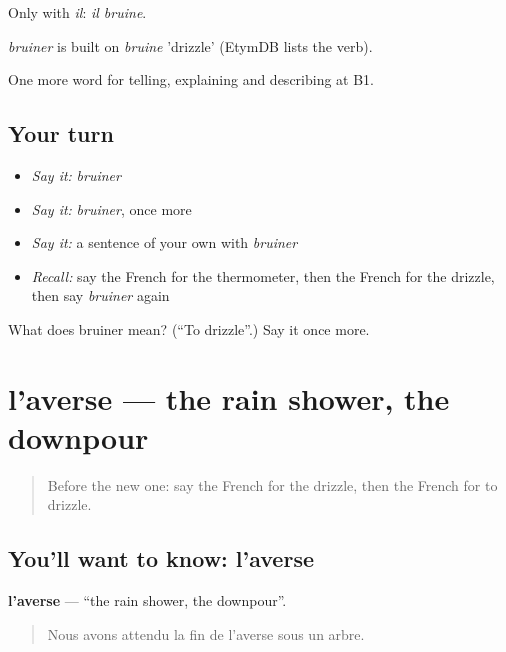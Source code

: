 Only with \emph{il}: \emph{il bruine}.

\begin{cousinweb}
\emph{bruiner} is built on \emph{bruine} 'drizzle' (EtymDB lists the verb).
\end{cousinweb}

\begin{grammarlens}[title={What you've built}]
One more word for telling, explaining and describing at B1.
\end{grammarlens}

\subsection*{Your turn}
\begin{itemize}
\raggedright
  \item \emph{Say it:} \emph{bruiner}
  \item \emph{Say it:} \emph{bruiner}, once more
  \item \emph{Say it:} a sentence of your own with \emph{bruiner}
  \item \emph{Recall:} say the French for the thermometer, then the French for the drizzle, then say \emph{bruiner} again
\end{itemize}

\begin{tcolorbox}[breakable,colback=teal!4,colframe=teal!35!black,title={Before you move on}]
What does bruiner mean? (\textquotedblleft{}To drizzle\textquotedblright{}.) Say it once more.
\end{tcolorbox}
\section[l'averse]{l'averse — the rain shower, the downpour}

\label{lesson:FR-C461-averse}



\begin{quote}
Before the new one: say the French for the drizzle, then the French for to drizzle.
\end{quote}

\subsection*{You'll want to know: l'averse}
\textbf{l'averse} — \textquotedblleft{}the rain shower, the downpour\textquotedblright{}.

\begin{quote}
Nous avons attendu la fin de l'averse sous un arbre.
\end{quote}

